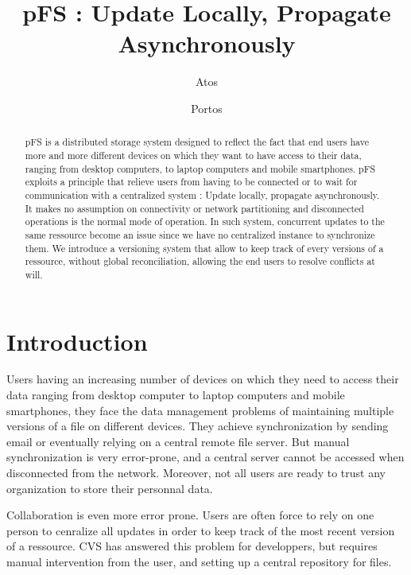 \documentclass[letterpaper,twocolumn,10pt]{article}
\begin{document}
\date{}
\title{pFS : Update Locally, Propagate Asynchronously}

\author{
{\rm Atos}\\
\and
{\rm Portos}\\
} %

\maketitle

\begin{abstract}
pFS is a distributed storage system designed to reflect the fact that
end users have more and more different devices on which they want to
have access to their data, ranging from desktop computers, to laptop
computers and mobile smartphones.  pFS exploits a principle that
relieve users from having to be connected or to wait for communication
with a centralized system : Update locally, propagate asynchronously.
It makes no assumption on connectivity or network partitioning and
disconnected operations is the normal mode of operation. In such
system, concurrent updates to the same ressource become an issue since
we have no centralized instance to synchronize them. We introduce a
versioning system that allow to keep track of every versions of a
ressource, without global reconciliation, allowing the end users to
resolve conflicts at will.
\end{abstract}


\section{Introduction}

Users having an increasing number of devices on which they need to
access their data ranging from desktop computer to laptop computers
and mobile smartphones, they face the data management problems of
maintaining multiple versions of a file on different devices. They
achieve synchronization by sending email or eventually relying on a
central remote file server. But manual synchronization is very
error-prone, and a central server cannot be accessed when disconnected
from the network. Moreover, not all users are ready to trust any
organization to store their personnal data.

Collaboration is even more error prone. Users are often force to rely
on one person to cenralize all updates in order to keep track of the
most recent version of a ressource. CVS has answered this problem for
developpers, but requires manual intervention from the user, and
setting up a central repository for files.
\end{document}
